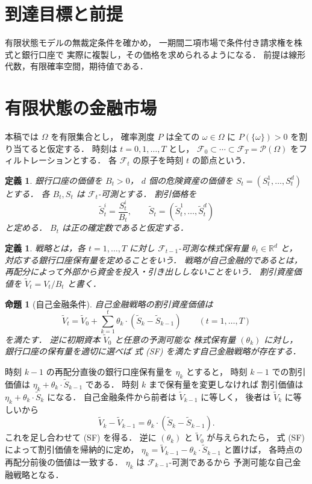 \documentclass[a5paper,10pt,onecolumn]{jsarticle}
\makeatletter
\theoremstyle{mathnotetheorem}
\newtheorem{definition}[theorem]{定義}
\newtheorem{proposition}[theorem]{命題}
\renewcommand{\proofname}{証明}
\renewenvironment{proof}[1][\proofname]{%
  \par\pushQED{\qed}\normalfont\topsep4\p@\@plus2\p@\relax
  \trivlist\item[\hskip\labelsep\bfseries #1]\ignorespaces
}{\popQED\endtrivlist\@endpefalse}
\makeatother
\begin{document}
\section*{到達目標と前提}
有限状態モデルの無裁定条件を確かめ，
一期間二項市場で条件付き請求権を株式と銀行口座で
実際に複製し，その価格を求められるようになる．
前提は線形代数，有限確率空間，期待値である．


\section{有限状態の金融市場}

本稿では $\Omega$ を有限集合とし，
確率測度 $P$ は全ての $\omega\in\Omega$ に
$P(\{\omega\})>0$ を割り当てると仮定する．
時刻は $t=0,1,\dots,T$ とし，
$\mathcal F_0\subset\cdots\subset\mathcal F_T
=\mathcal P(\Omega)$ をフィルトレーションとする．
各 $\mathcal F_t$ の原子を時刻 $t$ の節点という．

\begin{definition}
銀行口座の価値を $B_t>0$，
$d$ 個の危険資産の価値を
$S_t=(S_t^1,\dots,S_t^d)$ とする．
各 $B_t,S_t$ は $\mathcal F_t$-可測とする．
割引価格を
\[
 \widetilde S_t^i=\frac{S_t^i}{B_t},
 \qquad \widetilde S_t=(\widetilde S_t^1,\dots,\widetilde S_t^d)
\]
と定める．
$B_t$ は正の確定数であると仮定する．
\end{definition}

\begin{definition}
戦略とは，各 $t=1,\dots,T$ に対し
$\mathcal F_{t-1}$-可測な株式保有量
$\theta_t\in\mathbb R^d$ と，
対応する銀行口座保有量を定めることをいう．
戦略が\emph{自己金融的}であるとは，
再配分によって外部から資金を投入・引き出ししないことをいう．
割引資産価値を $\widetilde V_t=V_t/B_t$ と書く．
\end{definition}

\begin{proposition}[自己金融条件]\label{prop:self-financing}
自己金融戦略の割引資産価値は
\[
 \widetilde V_t
 =\widetilde V_0+
 \sum_{k=1}^t\theta_k\cdot
 (\widetilde S_k-\widetilde S_{k-1})
 \qquad(t=1,\dots,T)
 \tag{SF}
\]
を満たす．
逆に初期資本 $\widetilde V_0$ と任意の予測可能な
株式保有量 $(\theta_k)$ に対し，
銀行口座の保有量を適切に選べば
式 (SF) を満たす自己金融戦略が存在する．
\end{proposition}
\begin{proof}
時刻 $k-1$ の再配分直後の銀行口座保有量を
$\eta_k$ とすると，
時刻 $k-1$ での割引価値は
$\eta_k+\theta_k\cdot\widetilde S_{k-1}$ である．
時刻 $k$ まで保有量を変更しなければ
割引価値は
$\eta_k+\theta_k\cdot\widetilde S_k$ になる．
自己金融条件から前者は
$\widetilde V_{k-1}$ に等しく，
後者は $\widetilde V_k$ に等しいから
\[
 \widetilde V_k-\widetilde V_{k-1}
 =\theta_k\cdot(\widetilde S_k-\widetilde S_{k-1}).
\]
これを足し合わせて (SF) を得る．
逆に $(\theta_k)$ と $\widetilde V_0$ が与えられたら，
式 (SF) によって割引価値を帰納的に定め，
$\eta_k=\widetilde V_{k-1}
 -\theta_k\cdot\widetilde S_{k-1}$ と置けば，
各時点の再配分前後の価値は一致する．
$\eta_k$ は $\mathcal F_{k-1}$-可測であるから
予測可能な自己金融戦略となる．
\end{proof}
\end{document}
